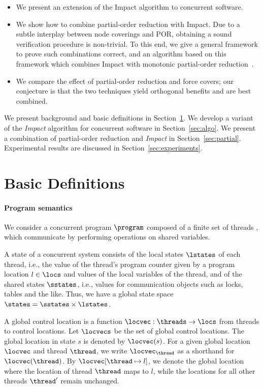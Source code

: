 \documentclass[conference]{IEEEtran}
\begin{document}
\begin{itemize}
  \item We present an extension of the Impact algorithm to concurrent software.
  \item We show how to combine partial-order reduction with Impact.
        Due to a subtle interplay between node coverings and POR,
        obtaining a sound verification procedure is non-trivial.
        To this end, we give a general framework to prove such combinations correct,
        and an algorithm based on this framework which combines
        Impact with monotonic partial-order reduction~\cite{DBLP:conf/tacas/WangYKG08}.
  \item We compare the effect of partial-order reduction
        and force covers; our conjecture is that the two techniques yield
        orthogonal benefits and are best combined.
\end{itemize}

We present background and basic definitions in Section~\ref{sec:basic}. 
We develop a variant of the \emph{Impact} algorithm for concurrent software
in Section~\ref{sec:algo}.  We present a combination of partial-order
reduction and \emph{Impact} in Section~\ref{sec:partial}.  Experimental
results are discussed in Section~\ref{sec:experiments}.

\section{Basic Definitions}
\label{sec:basic}

\paragraph*{Program semantics}

We consider a concurrent program $\program$ composed of a finite set of
threads \threads, which communicate by performing operations on
shared variables.

A state of a concurrent system consists of the local states $\lstates$ of
each thread, i.e., the value of the thread's program counter given by a
program location $l \in \locs$ and values of the local variables of the
thread, and of the shared states $\sstates$, i.e., values for communication
objects such as locks, tables and the like.  Thus, we have a global state
space $\states=\sstates\times\lstates$.

A global control location is a function $\locvec:\threads \to \locs$ from
threads to control locations.  Let $\locvecs$ be the set of global control
locations.  The global location in state $s$ is denoted by $\locvec(s)$. 
For a given global location $\locvec$ and thread $\thread$, we write
$\locvec_\thread$ as a shorthand for $\locvec(\thread)$.  By
$\locvec[\thread\mapsto l]$, we denote the global location where the
location of thread $\thread$ maps to $l$, while the locations for 
all other threads $\thread'$ remain unchanged.
\end{document}
